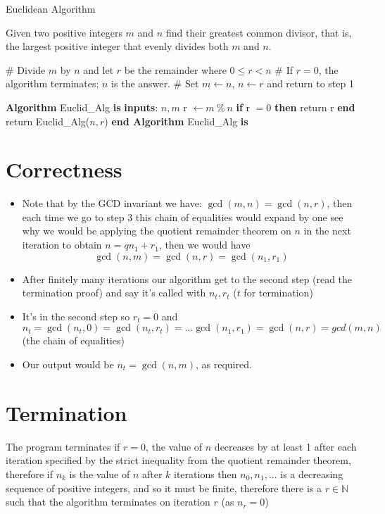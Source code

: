 \documentclass{standalone}
\begin{document}
\begin{defn*}{Euclidean Algorithm}

Given two positive integers $m$ and $n$ find their greatest common divisor, that is, the largest positive integer that evenly divides both $m$ and $n$.

\begin{enumerate}
  # Divide $m$ by $n$ and let $r$ be the remainder where $0 \le r < n$
  # If $r =0$, the algorithm terminates; $n$ is the answer.
  # Set $m \leftarrow n$, $n \leftarrow r$ and return to step 1
\end{enumerate}

\textbf{Algorithm} Euclid_Alg \textbf{is}
  \textbf{inputs}: $ n, m$ 
  r $\leftarrow m ~\%~ n$ 
  \textbf{if} r $ = 0$ \textbf{then}
    return r
  \textbf{end}
  return Euclid_Alg($ n, r $)
\textbf{end Algorithm} Euclid_Alg \textbf{is}

\section*{Correctness}
\begin{pf}
  \begin{itemize}
    \item Note that by the GCD invariant we have: $\gcd(m,n) = \gcd(n,r)$, then each time we go to step 3 this chain of equalities would expand by one
    \itemTo see why we would be applying the quotient remainder theorem on $n$ in the next iteration to obtain $n = q n_1 + r_1$, then we would have 
    \[
      \gcd(n,m) = \gcd(n,r) = \gcd(n_1, r_1)
    \]
    \item After finitely many iterations our algorithm get to the second step (read the termination proof) and say it's called with $n_t, r_t$ ($t$ for termination)
    \item It's in the second step so  $r_t = 0$ and $n_t = \gcd(n_t,0) = \gcd(n_t, r_t) = ... \gcd(n_1, r_1) = \gcd(n, r) = gcd(m,n)$ (the chain of equalities) 
    \item Our output would be $n_t = \gcd(n,m)$, as required.
  \end{itemize}
\end{pf}

\section*{Termination}

The program terminates if $r = 0$, the value of $n$ decreases by at least 1 after each iteration specified by the strict inequality from the quotient remainder theorem, therefore if $n_k$ is the value of $n$ after $k$ iterations then $n_0, n_1, ...$ is a decreasing sequence of positive integers, and so it must be finite, therefore there is a $r \in \mathbb{N}$ such that the algorithm terminates on iteration $r$ (as $n_r = 0$)

\end{defn*}
\end{document}
